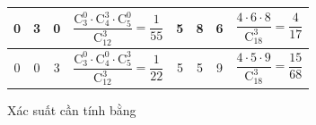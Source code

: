 \begin{bt}
{\begin{center}
{\begin{tabular}{|lll|l|ccc|c|}
	 \hline
	\multicolumn{1}{|c|}{0} & \multicolumn{1}{|c|}{3} & \multicolumn{1}{|c|}{0} & $\dfrac{\mathrm{C}_3^0 \cdot \mathrm{C}_4^3 \cdot  \mathrm{C}_5^0}{\mathrm{C}_{12}^3}=\dfrac{1}{55}$ & \multicolumn{1}{|c|}{5} & \multicolumn{1}{|c|}{8} & \multicolumn{1}{|c|}{6} & $\dfrac{4\cdot6\cdot8}{\mathrm{C}_{18}^3}=\dfrac{4}{17}$ \\
	 \hline
	\multicolumn{1}{|c|}{0} & \multicolumn{1}{|c|}{0} & \multicolumn{1}{|c|}{3} & $\dfrac{\mathrm{C}_3^0 \cdot \mathrm{C}_4^0 \cdot \mathrm{C}_5^3}{\mathrm{C}_{12}^3}=\dfrac{1}{22}$ &  \multicolumn{1}{|c|}{5} & \multicolumn{1}{|c|}{5} & \multicolumn{1}{|c|}{9} & $\dfrac{4\cdot5\cdot9}{\mathrm{C}_{18}^3}=\dfrac{15}{68}$ \\
	\hline 
	\end{tabular}
	} 
	\end{center}
	Xác  suất cần tính bằng
	\begin{center}
	\end{center}
} 
\end{bt}

